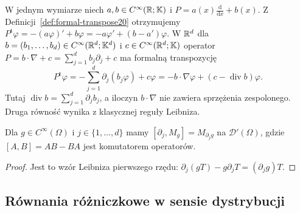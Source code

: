 \begin{przyklad}
\label{ex:first-order-P20}
W jednym wymiarze niech $a,b\in C^\infty(\mathbb R;\mathbb K)$
i $P=a(x)\frac{\mathrm d}{\mathrm dx}+b(x)$.
Z Definicji~\ref{def:formal-transpose20} otrzymujemy
$P^{\mathrm t}\varphi=-(a\varphi)'+b\varphi
=-a\varphi'+(b-a')\varphi$.
W $\mathbb R^d$ dla $b=(b_1,\ldots,b_d)\in C^\infty(\mathbb R^d;\mathbb K^d)$
i $c\in C^\infty(\mathbb R^d;\mathbb K)$ operator
$P=b\cdot\nabla+c=\sum_{j=1}^d b_j\partial_j+c$
ma formalną transpozycję
\[
P^{\mathrm t}\varphi=-\sum_{j=1}^d\partial_j(b_j\varphi)
+c\varphi=-b\cdot\nabla\varphi+(c-\operatorname{div}b)\varphi.
\]
Tutaj $\operatorname{div}b=\sum_{j=1}^d\partial_j b_j$,
a iloczyn $b\cdot\nabla$ nie zawiera sprzężenia zespolonego.
Druga równość wynika z klasycznej reguły Leibniza.
\end{przyklad}

\begin{wniosek}
\label{cor:commutator20}
Dla $g\in C^\infty(\Omega)$ i $j\in\{1,\ldots,d\}$ mamy
$[\partial_j,M_g]=M_{\partial_jg}$ na $\mathcal D'(\Omega)$,
gdzie $[A,B]=AB-BA$ jest komutatorem operatorów.
\end{wniosek}
\begin{proof}
Jest to wzór Leibniza pierwszego rzędu:
$\partial_j(gT)-g\partial_jT=(\partial_jg)T$.
\end{proof}

\subsection{Równania różniczkowe w sensie dystrybucji}

